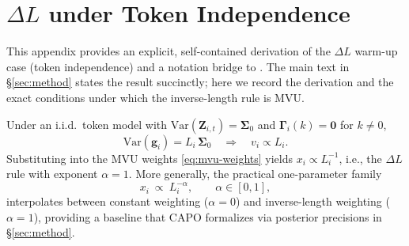 \section{\texorpdfstring{$\Delta L$}{Delta L} under Token Independence}\label{app:warmup}

This appendix provides an explicit, self-contained derivation of the $\Delta L$ warm-up case (token independence) and a notation bridge to \citet{he2025deltal}. The main text in \S\ref{sec:method} states the result succinctly; here we record the derivation and the exact conditions under which the inverse-length rule is MVU.

Under an i.i.d.\ token model with $\mathrm{Var}(\boldsymbol{Z}_{i,t})=\boldsymbol{\Sigma}_0$ and $\boldsymbol{\Gamma}_i(k)=\boldsymbol{0}$ for $k\neq 0$,
\begin{equation}
  \mathrm{Var}(\boldsymbol{g}_i)=L_i\,\boldsymbol{\Sigma}_0
  \quad\Longrightarrow\quad
  v_i \propto L_i.
\end{equation}
Substituting into the MVU weights \eqref{eq:mvu-weights} yields $x_i\propto L_i^{-1}$, i.e., the $\Delta L$ rule with exponent $\alpha=1$. More generally, the practical one-parameter family
\begin{equation}
  x_i \ \propto\ L_i^{-\alpha},\qquad \alpha\in[0,1],
\end{equation}
interpolates between constant weighting ($\alpha=0$) and inverse-length weighting ($\alpha=1$), providing a baseline that CAPO formalizes via posterior precisions in \S\ref{sec:method}.